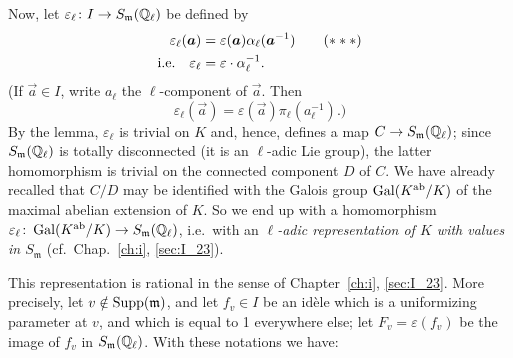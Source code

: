 Now, let $\varepsilon_\ell \colon I \to
S_{\mathfrak{m}}(\Q_\ell)$ be defined by
\dpage
\begin{align}
	\varepsilon_\ell(\vec a) &= \varepsilon(\vec a) \alpha_\ell(\vec a^{-1})
	\tag{$***$}\label{eqn:II_23_star} \\
	\text{i.e.} \quad \varepsilon_\ell &= \varepsilon \cdot \alpha_\ell^{-1}.
	\notag
\end{align}
(If $\vec a \in I$, write $a_\ell$ the $\ell$-component of $\vec a$. Then
\[
	\varepsilon_\ell(\vec a) = \varepsilon(\vec a) \pi_\ell(a_\ell^{-1}).)
\]
By the lemma, $\varepsilon_\ell$ is trivial on $K$ and, hence, defines a map
$C \to S_{\mathfrak{m}}(\Q_\ell)$; since $S_{\mathfrak{m}}(\Q_\ell)$ is
totally disconnected (it is an $\ell$-adic Lie group), the latter homomorphism is
trivial on the connected component $D$ of $C$. We have already recalled that $C/D$
may be identified with the Galois group $\Gal(\abcl K/K)$ of the maximal abelian
extension of $K$. So we end up with a homomorphism $\varepsilon_\ell \colon
\Gal(\abcl K/K) \to S_{\mathfrak{m}}(\Q_\ell)$, i.e.\ with an \emph{$\ell$-adic
representation of $K$ with values in $S_{\mathfrak{m}}$} (cf.\ 
Chap.~\ref{ch:i}, \ref{sec:I_23}).

This representation is rational in the sense of Chapter~\ref{ch:i},
\ref{sec:I_23}.  More precisely, let $v \notin \Supp(\mathfrak{m})$, and let
$f_v \in I$ be an idèle which is a uniformizing parameter at $v$, and which is
equal to 1 everywhere else; let $F_v = \varepsilon(f_v)$ be the image of $f_v$
in $S_{\mathfrak{m}}(\Q_\ell)$. With these notations we have:

